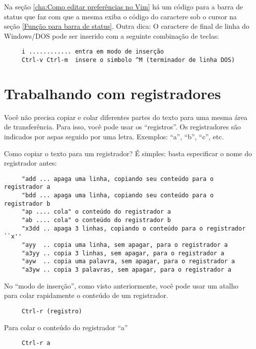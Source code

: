 Na seção \ref{cha:Como editar preferências no Vim} há um código para a barra de
status que faz com que a mesma exiba o código do caractere sob o cursor na
seção \ref{Função para barra de status}. Outra dica: O caractere de final de linha
do Windows/DOS pode ser inserido com a seguinte combinação de teclas:
    
\begin{verbatim}
     i ............ entra em modo de inserção
     Ctrl-v Ctrl-m  insere o simbolo ^M (terminador de linha DOS) 
\end{verbatim}

\section{Trabalhando com registradores}
\label{Trabalhando com registradores}

Você não precisa copiar e colar diferentes partes do texto para uma
mesma área de transferência.  Para isso, você pode usar os
``registros''.  Os registradores são indicados por aspas seguido por uma letra.
Exemplos: ``a'', ``b'', ``c'', etc.

Como copiar o texto para um registrador? É simples: basta especificar
o nome do registrador antes:

\begin{verbatim}
     "add ... apaga uma linha, copiando seu conteúdo para o registrador a
     "bdd ... apaga uma linha, copiando seu conteúdo para o registrador b
     "ap .... cola" o conteúdo do registrador a
     "ab .... cola" o conteúdo do registrador b
     "x3dd .. apaga 3 linhas, copiando o conteúdo para o registrador ``x''
     "ayy  .. copia uma linha, sem apagar, para o registrador a
     "a3yy .. copia 3 linhas, sem apagar, para o registrador a
     "ayw  .. copia uma palavra, sem apagar, para o registrador a
     "a3yw .. copia 3 palavras, sem apagar, para o registrador a
\end{verbatim}

No ``modo de inserção'', como visto anteriormente, você pode usar um atalho
para colar rapidamente o conteúdo de um registrador.

\begin{verbatim}
     Ctrl-r (registro)
\end{verbatim}

Para colar o conteúdo do registrador ``a''

\begin{verbatim}
     Ctrl-r a
\end{verbatim}

